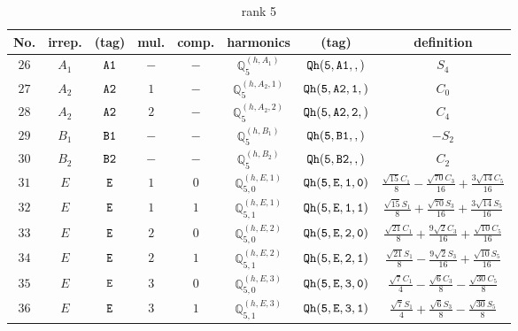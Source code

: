 \documentclass[fleqn,8pt]{jsarticle}
\begin{document}
\begin{table}[ht!]
\begin{center}
\caption{rank 5}
\renewcommand{\arraystretch}{1.3}
\begin{tabular}{cccccccc} \hline \hline
No. & irrep. & (tag) & mul. & comp. & harmonics & (tag) & definition \\ \hline
$ 26 $ & $ A_{1} $ & $ {\tt A1} $ & $ - $ & $ - $ & $ \mathbb{Q}_{5}^{(h,A_{1})} $ & $ {\tt Qh(5,A1,,)} $ & $ S_{4} $ \\
$ 27 $ & $ A_{2} $ & $ {\tt A2} $ & $ 1 $ & $ - $ & $ \mathbb{Q}_{5}^{(h,A_{2},1)} $ & $ {\tt Qh(5,A2,1,)} $ & $ C_{0} $ \\
$ 28 $ & $ A_{2} $ & $ {\tt A2} $ & $ 2 $ & $ - $ & $ \mathbb{Q}_{5}^{(h,A_{2},2)} $ & $ {\tt Qh(5,A2,2,)} $ & $ C_{4} $ \\
$ 29 $ & $ B_{1} $ & $ {\tt B1} $ & $ - $ & $ - $ & $ \mathbb{Q}_{5}^{(h,B_{1})} $ & $ {\tt Qh(5,B1,,)} $ & $ - S_{2} $ \\
$ 30 $ & $ B_{2} $ & $ {\tt B2} $ & $ - $ & $ - $ & $ \mathbb{Q}_{5}^{(h,B_{2})} $ & $ {\tt Qh(5,B2,,)} $ & $ C_{2} $ \\
$ 31 $ & $ E $ & $ {\tt E} $ & $ 1 $ & $ 0 $ & $ \mathbb{Q}_{5,0}^{(h,E,1)} $ & $ {\tt Qh(5,E,1,0)} $ & $ \frac{\sqrt{15} C_{1}}{8} - \frac{\sqrt{70} C_{3}}{16} + \frac{3 \sqrt{14} C_{5}}{16} $ \\
$ 32 $ & $ E $ & $ {\tt E} $ & $ 1 $ & $ 1 $ & $ \mathbb{Q}_{5,1}^{(h,E,1)} $ & $ {\tt Qh(5,E,1,1)} $ & $ \frac{\sqrt{15} S_{1}}{8} + \frac{\sqrt{70} S_{3}}{16} + \frac{3 \sqrt{14} S_{5}}{16} $ \\
$ 33 $ & $ E $ & $ {\tt E} $ & $ 2 $ & $ 0 $ & $ \mathbb{Q}_{5,0}^{(h,E,2)} $ & $ {\tt Qh(5,E,2,0)} $ & $ \frac{\sqrt{21} C_{1}}{8} + \frac{9 \sqrt{2} C_{3}}{16} + \frac{\sqrt{10} C_{5}}{16} $ \\
$ 34 $ & $ E $ & $ {\tt E} $ & $ 2 $ & $ 1 $ & $ \mathbb{Q}_{5,1}^{(h,E,2)} $ & $ {\tt Qh(5,E,2,1)} $ & $ \frac{\sqrt{21} S_{1}}{8} - \frac{9 \sqrt{2} S_{3}}{16} + \frac{\sqrt{10} S_{5}}{16} $ \\
$ 35 $ & $ E $ & $ {\tt E} $ & $ 3 $ & $ 0 $ & $ \mathbb{Q}_{5,0}^{(h,E,3)} $ & $ {\tt Qh(5,E,3,0)} $ & $ \frac{\sqrt{7} C_{1}}{4} - \frac{\sqrt{6} C_{3}}{8} - \frac{\sqrt{30} C_{5}}{8} $ \\
$ 36 $ & $ E $ & $ {\tt E} $ & $ 3 $ & $ 1 $ & $ \mathbb{Q}_{5,1}^{(h,E,3)} $ & $ {\tt Qh(5,E,3,1)} $ & $ \frac{\sqrt{7} S_{1}}{4} + \frac{\sqrt{6} S_{3}}{8} - \frac{\sqrt{30} S_{5}}{8} $ \\
 \hline \hline
\end{tabular}
\end{center}
\end{table}
\end{document}
